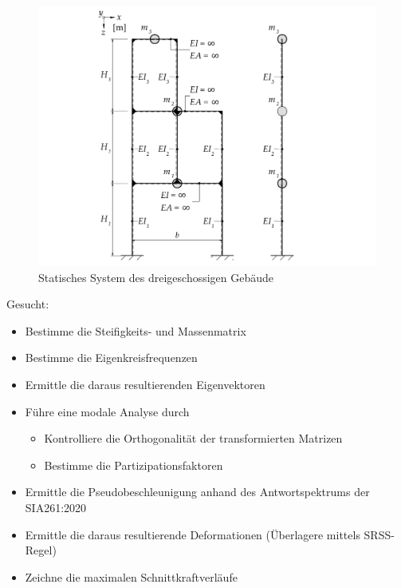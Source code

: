 \documentclass[
  letterpaper,
  DIV=11]{scrreprt}
\providecommand{\tightlist}{%
  \setlength{\itemsep}{0pt}\setlength{\parskip}{0pt}}\usepackage{longtable,booktabs,array}
\begin{document}
\begin{figure}[H]

{\centering \includegraphics{index_files/mediabag/bilder/aufgabe_mms_3er_system.pdf}

}

\caption{\label{fig-mms_3er_system}Statisches System des
dreigeschossigen Gebäude}

\end{figure}

Gesucht:

\begin{itemize}
\tightlist
\item
  Bestimme die Steifigkeits- und Massenmatrix
\item
  Bestimme die Eigenkreisfrequenzen
\item
  Ermittle die daraus resultierenden Eigenvektoren
\item
  Führe eine modale Analyse durch

  \begin{itemize}
  \tightlist
  \item
    Kontrolliere die Orthogonalität der transformierten Matrizen
  \item
    Bestimme die Partizipationsfaktoren
  \end{itemize}
\item
  Ermittle die Pseudobeschleunigung anhand des Antwortspektrums der
  SIA261:2020
\item
  Ermittle die daraus resultierende Deformationen (Überlagere mittels
  SRSS-Regel)
\item
  Zeichne die maximalen Schnittkraftverläufe
\end{itemize}
\end{document}
